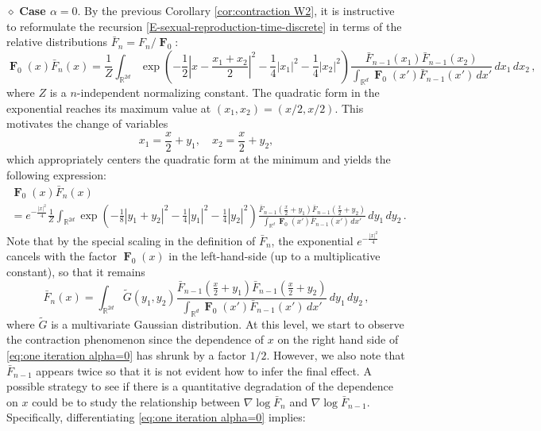\documentclass[reqno]{amsart}
\DeclareMathOperator{\bF}{\boldsymbol{F}}
\numberwithin{equation}{section}
\begin{document}
{$\diamond$ {\bf Case $\alpha=0$}. By the previous Corollary \ref{cor:contraction W2}, it is instructive to reformulate the recursion \eqref{E-sexual-reproduction-time-discrete} in terms of the relative distributions $\bar F_n = F_n/{\bF_0}$:
$$
\bF_0(x) \bar F_n(x) = \frac1Z \int_{\mathbb{R}^{2d}} \exp\left ( - \frac12 \left|x-\frac{x_1+x_2}{2}\right|^2 - \frac14 |x_1|^2 - \frac14 |x_2|^2 \right ) \frac{  \bar F_{n-1}(x_1)\bar F_{n-1}(x_2)}{\int_{\mathbb{R}^d} \bF_0(x') \bar F_{n-1}(x')\,dx'}\,dx_1\,dx_2 \,,
$$
where $Z$ is a $n$-independent normalizing constant. The quadratic form in the exponential reaches its maximum value at $(x_1,x_2) = (x/2, x/2)$. This motivates the change of variables 
$$
x_1=\frac{x}{2}+y_1,\quad x_2=\frac{x}{2}+y_2,
$$
which appropriately centers the quadratic form at the minimum and yields the following expression: 
\begin{multline}\label{eq:int change var}
\bF_0(x) \bar F_n(x) \\
=  e^{-\frac{\vert x\vert^2}{4}} \frac1Z \int_{\mathbb{R}^{2d}} \exp\left ( - \frac{1}{8}|y_1 + y_2|^2 - \frac14 |y_1|^2 - \frac14 |y_2|^2  \right ) \frac{  \bar F_{n-1}(\frac x2 + y_1 )\bar F_{n-1}(\frac x2 + y_2)}{\int_{\mathbb{R}^d} \bF_0(x') \bar F_{n-1}(x')\,dx'}\,dy_1\,dy_2 \,.
\end{multline}
Note that by the special scaling in the definition of $\bar F_n$, the exponential $e^{-\frac{\vert x\vert^2}{4}}$ cancels with the factor $\bF_0(x)$ in the left-hand-side (up to a multiplicative constant), so that it remains
\begin{equation}\label{eq:one iteration alpha=0}
\bar F_n(x) =   \int_{\mathbb{R}^{2d}} \widetilde G(y_1,y_2) \frac{\bar F_{n-1}(\frac x2 + y_1 )\bar F_{n-1}(\frac x2 + y_2)}{\int_{\mathbb{R}^d} \bF_0(x') \bar F_{n-1}(x')\,dx'}\,dy_1\,dy_2 \,,
\end{equation}
where $\widetilde G$ is a multivariate Gaussian distribution. At this level, we start to observe the contraction phenomenon since the dependence of $x$ on the right hand side of \eqref{eq:one iteration alpha=0} has shrunk by a factor $1/2$. However, we also note that $\bar F_{n-1}$ appears twice so that it is not evident how to infer the final effect. A possible strategy to see if there is a quantitative degradation of the dependence on $x$ could be to study the relationship between $\nabla \log \bar F_n$ and $\nabla \log \bar F_{n-1}$. Specifically, differentiating \eqref{eq:one iteration alpha=0} implies:
\begin{align}\label{eq:gradient log Hn}

\end{align}}
\end{document}
